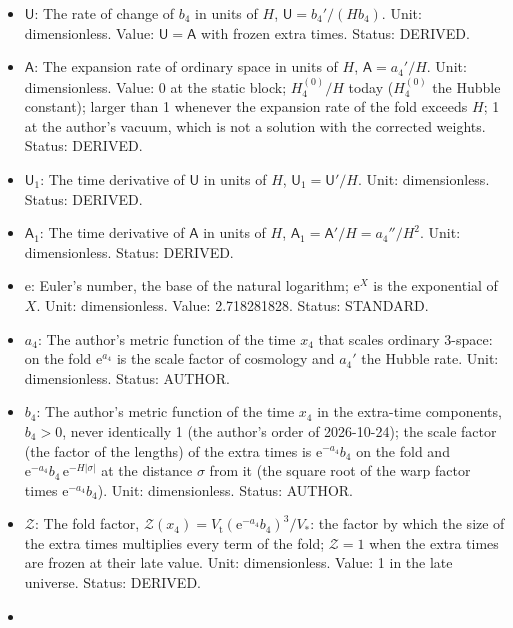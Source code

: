\documentclass[
  10pt,
]{article}
\providecommand{\tightlist}{%
  \setlength{\itemsep}{0pt}\setlength{\parskip}{0pt}}
\begin{document}
\begin{itemize}
\tightlist
\item
  \(\mathsf{U}\): The rate of change of \(b_4\) in units of \(H\),
  \(\mathsf{U} = b_4'/(Hb_4)\). Unit: dimensionless. Value:
  \(\mathsf{U} = \mathsf{A}\) with frozen extra times. Status: DERIVED.
\item
  \(\mathsf{A}\): The expansion rate of ordinary space in units of
  \(H\), \(\mathsf{A} = a_4'/H\). Unit: dimensionless. Value: 0 at the
  static block; \(H_4^{(0)}/H\) today (\(H_4^{(0)}\) the Hubble
  constant); larger than 1 whenever the expansion rate of the fold
  exceeds \(H\); 1 at the author's vacuum, which is not a solution with
  the corrected weights. Status: DERIVED.
\item
  \(\mathsf{U}_1\): The time derivative of \(\mathsf{U}\) in units of
  \(H\), \(\mathsf{U}_1 = \mathsf{U}'/H\). Unit: dimensionless. Status:
  DERIVED.
\item
  \(\mathsf{A}_1\): The time derivative of \(\mathsf{A}\) in units of
  \(H\), \(\mathsf{A}_1 = \mathsf{A}'/H = a_4''/H^2\). Unit:
  dimensionless. Status: DERIVED.
\item
  \(\mathrm{e}\): Euler's number, the base of the natural logarithm;
  \(\mathrm{e}^{X}\) is the exponential of \(X\). Unit: dimensionless.
  Value: 2.718281828. Status: STANDARD.
\item
  \(a_4\): The author's metric function of the time \(x_4\) that scales
  ordinary 3-space: on the fold \(\mathrm{e}^{a_4}\) is the scale factor
  of cosmology and \(a_4'\) the Hubble rate. Unit: dimensionless.
  Status: AUTHOR.
\item
  \(b_4\): The author's metric function of the time \(x_4\) in the
  extra-time components, \(b_4 > 0\), never identically 1 (the author's
  order of 2026-10-24); the scale factor (the factor of the lengths) of
  the extra times is \(\mathrm{e}^{-a_4}b_4\) on the fold and
  \(\mathrm{e}^{-a_4}b_4\,\mathrm{e}^{-H\lvert\sigma\rvert}\) at the
  distance \(\sigma\) from it (the square root of the warp factor times
  \(\mathrm{e}^{-a_4}b_4\)). Unit: dimensionless. Status: AUTHOR.
\item
  \(\mathcal{Z}\): The fold factor,
  \(\mathcal{Z}(x_4) = V_{\mathrm{t}}(\mathrm{e}^{-a_4}b_4)^3/V_*\): the
  factor by which the size of the extra times multiplies every term of
  the fold; \(\mathcal{Z} = 1\) when the extra times are frozen at their
  late value. Unit: dimensionless. Value: 1 in the late universe.
  Status: DERIVED.
\item

\end{itemize}
\end{document}
